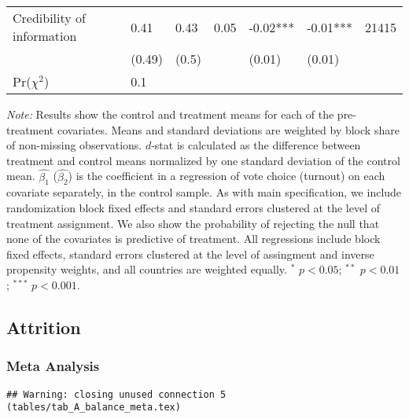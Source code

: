 \documentclass[]{article}
\begin{document}
\begin{table}[htb]
\begin{tabular}{lllllll}
  Credibility of information & 0.41 & 0.43 & 0.05 & -0.02*** & -0.01*** & 21415 \\ 
   & (0.49) & (0.5) &  & (0.01) & (0.01) &  \\ 
\hline Pr($\chi^2$) &0.1&&&&& \\ \hline\hline
\end{tabular}
\begin{flushleft}\textit{Note:} Results show the control and treatment means for each of the pre-treatment covariates. Means and standard deviations are weighted by block share of non-missing observations. $d$-stat is calculated as the difference between treatment and control means normalized by one standard deviation of the control mean. $\hat{\beta_1}$ ($\hat{\beta_2}$) is the coefficient in a regression of vote choice (turnout) on each covariate separately, in the control sample. As with main specification, we include randomization block fixed effects and standard errors clustered at the level of treatment assignment. We also show the probability of rejecting the null that none of the covariates is predictive of treatment. All regressions include block fixed effects, standard errors clustered at the level of assingment and inverse propensity weights, and all countries are weighted equally. $^*$ $p<0.05$; $^{**}$ $p<0.01$; $^{***}$ $p<0.001$. \end{flushleft}
\end{table}

\clearpage

\subsection{Attrition}\label{attrition}

\subsubsection{Meta Analysis}\label{meta-analysis}

\begin{verbatim}
## Warning: closing unused connection 5 (tables/tab_A_balance_meta.tex)
\end{verbatim}
\end{document}
